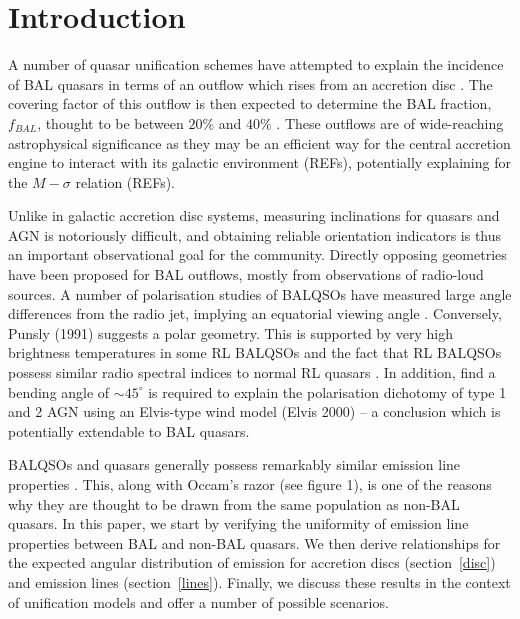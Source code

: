 \clearpage

%
%


\section{Introduction}

\noindent
A number of quasar unification schemes have attempted to explain 
the incidence of BAL quasars in terms of an outflow which rises 
from an accretion disc \citep[e.g.][]{MCGV95, elvis2000}. 
The covering factor of this outflow is then
expected to determine the BAL fraction, $f_{BAL}$, thought to be
between $20\%$ and $40\%$ 
\citep{weymann1991, reichard2003, knigge2008, allen2011}.
These outflows are of wide-reaching astrophysical significance as 
they may be an efficient way for the central accretion engine to interact
with its galactic environment (REFs), potentially explaining 
for the $M-\sigma$ relation (REFs).

Unlike in galactic accretion disc systems, measuring inclinations
for quasars and AGN is notoriously difficult, and obtaining 
reliable orientation indicators is thus an important observational
goal for the community. Directly opposing 
geometries have been proposed for BAL outflows, mostly from observations
of radio-loud sources. A number of polarisation
studies of BALQSOs have measured large angle differences 
from the radio jet, implying an equatorial viewing angle 
\citep{goodrich1995, cohen1995,brotherton2006}.
Conversely, Punsly (1991) suggests a polar geometry.
This is supported by very high brightness temperatures 
in some RL BALQSOs \citep{zhou2006} 
and the fact that RL BALQSOs possess similar radio spectral 
indices to normal RL quasars \citep{bruni2012}.  
In addition, \cite{marin2013} find a bending angle of $\sim45^\circ$ is required to 
explain the polarisation dichotomy of type 1 and 2 AGN using an Elvis-type wind 
model (Elvis 2000) --  a conclusion which is potentially extendable to BAL quasars.

BALQSOs and quasars generally possess remarkably similar emission line properties 
\citep[e.g.][]{weymann1991,reichard2003}. This, along with Occam's razor (see figure 1),
is one of the reasons why they are thought to be drawn from the same population 
as non-BAL quasars. In this paper, we start by verifying the uniformity 
of emission line properties
between BAL and non-BAL quasars. We then derive relationships for
the expected angular distribution of emission for accretion discs 
(section~\ref{disc}) and emission lines (section~\ref{lines}). Finally, we discuss
these results in the context of unification models and offer 
a number of possible scenarios.


